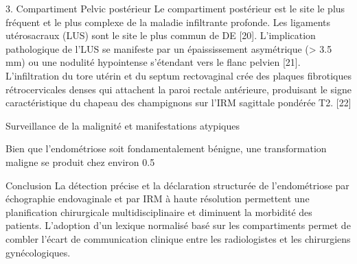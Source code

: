 \documentclass[11pt,a4paper]{article}
\begin{document}
3. Compartiment Pelvic postérieur Le compartiment postérieur est le site le plus fréquent et le plus complexe de la maladie infiltrante profonde. Les ligaments utérosacraux (LUS) sont le site le plus commun de DE [20]. L'implication pathologique de l'LUS se manifeste par un épaississement asymétrique (> 3.5 mm) ou une nodulité hypointense s'étendant vers le flanc pelvien [21]. L'infiltration du tore utérin et du septum rectovaginal crée des plaques fibrotiques rétrocervicales denses qui attachent la paroi rectale antérieure, produisant le signe caractéristique du chapeau des champignons sur l'IRM sagittale pondérée T2. [22]

Surveillance de la malignité et manifestations atypiques

Bien que l'endométriose soit fondamentalement bénigne, une transformation maligne se produit chez environ 0.5%

Conclusion La détection précise et la déclaration structurée de l'endométriose par échographie endovaginale et par IRM à haute résolution permettent une planification chirurgicale multidisciplinaire et diminuent la morbidité des patients. L'adoption d'un lexique normalisé basé sur les compartiments permet de combler l'écart de communication clinique entre les radiologistes et les chirurgiens gynécologiques.
\end{document}
